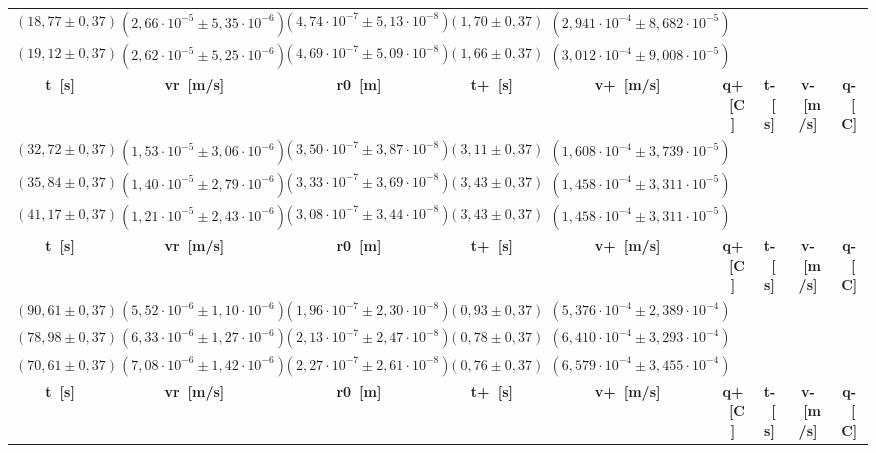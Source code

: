 \documentclass{article}
\begin{document}
\begin{table}[H]
\begin{flushleft}
\begin{tabular}{|c|c|c|c|c|c|c|c|c|}
        \((18,77 \pm 0,37)\) & \((2,66 \cdot 10^{-5} \pm 5,35 \cdot 10^{-6})\) & \((4,74 \cdot 10^{-7} \pm 5,13 \cdot 10^{-8})\) & \((1,70 \pm 0,37)\) & \((2,941 \cdot 10^{-4} \pm 8,682 \cdot 10^{-5})\) \\
        \((19,12 \pm 0,37)\) & \((2,62 \cdot 10^{-5} \pm 5,25 \cdot 10^{-6})\) & \((4,69 \cdot 10^{-7} \pm 5,09 \cdot 10^{-8})\) & \((1,66 \pm 0,37)\) & \((3,012 \cdot 10^{-4} \pm 9,008 \cdot 10^{-5})\) \\
        \toprule
        \textbf{t~[s]} & \textbf{vr~[m/s]} & \textbf{r0~[m]} & \textbf{t+~[s]} & \textbf{v+~[m/s]} & \textbf{q+~[C]} & \textbf{t-~[s]} & \textbf{v-~[m/s]} & \textbf{q-~[C]} \\
        \midrule
        \((32,72 \pm 0,37)\) & \((1,53 \cdot 10^{-5} \pm 3,06 \cdot 10^{-6})\) & \((3,50 \cdot 10^{-7} \pm 3,87 \cdot 10^{-8})\) & \((3,11 \pm 0,37)\) & \((1,608 \cdot 10^{-4} \pm 3,739 \cdot 10^{-5})\) \\
        \((35,84 \pm 0,37)\) & \((1,40 \cdot 10^{-5} \pm 2,79 \cdot 10^{-6})\) & \((3,33 \cdot 10^{-7} \pm 3,69 \cdot 10^{-8})\) & \((3,43 \pm 0,37)\) & \((1,458 \cdot 10^{-4} \pm 3,311 \cdot 10^{-5})\) \\
        \((41,17 \pm 0,37)\) & \((1,21 \cdot 10^{-5} \pm 2,43 \cdot 10^{-6})\) & \((3,08 \cdot 10^{-7} \pm 3,44 \cdot 10^{-8})\) & \((3,43 \pm 0,37)\) & \((1,458 \cdot 10^{-4} \pm 3,311 \cdot 10^{-5})\) \\
        \toprule
        \textbf{t~[s]} & \textbf{vr~[m/s]} & \textbf{r0~[m]} & \textbf{t+~[s]} & \textbf{v+~[m/s]} & \textbf{q+~[C]} & \textbf{t-~[s]} & \textbf{v-~[m/s]} & \textbf{q-~[C]} \\
        \midrule
        \((90,61 \pm 0,37)\) & \((5,52 \cdot 10^{-6} \pm 1,10 \cdot 10^{-6})\) & \((1,96 \cdot 10^{-7} \pm 2,30 \cdot 10^{-8})\) & \((0,93 \pm 0,37)\) & \((5,376 \cdot 10^{-4} \pm 2,389 \cdot 10^{-4})\) \\
        \((78,98 \pm 0,37)\) & \((6,33 \cdot 10^{-6} \pm 1,27 \cdot 10^{-6})\) & \((2,13 \cdot 10^{-7} \pm 2,47 \cdot 10^{-8})\) & \((0,78 \pm 0,37)\) & \((6,410 \cdot 10^{-4} \pm 3,293 \cdot 10^{-4})\) \\
        \((70,61 \pm 0,37)\) & \((7,08 \cdot 10^{-6} \pm 1,42 \cdot 10^{-6})\) & \((2,27 \cdot 10^{-7} \pm 2,61 \cdot 10^{-8})\) & \((0,76 \pm 0,37)\) & \((6,579 \cdot 10^{-4} \pm 3,455 \cdot 10^{-4})\) \\
        \toprule
        \textbf{t~[s]} & \textbf{vr~[m/s]} & \textbf{r0~[m]} & \textbf{t+~[s]} & \textbf{v+~[m/s]} & \textbf{q+~[C]} & \textbf{t-~[s]} & \textbf{v-~[m/s]} & \textbf{q-~[C]} \\

\end{tabular}
\end{flushleft}
\end{table}
\end{document}

